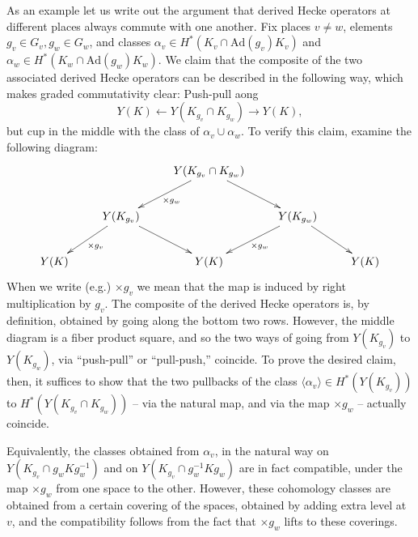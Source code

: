 \documentclass[10pt]{amsart}
\newcommand{\changecolor}{black}
\newcommand{\Ad}{\mathrm{Ad}}
\theoremstyle{remark}
\begin{document}
{\color{\changecolor}    As an example let us write out the argument that derived Hecke operators at different places always commute with one another.   
 Fix places $v \neq w$, elements $g_v \in G_v, g_w \in G_w$,
 and classes $\alpha_v \in H^*(K_v \cap \Ad(g_v) K_v)$ and $\alpha_w \in H^*(K_w \cap \Ad(g_w) K_w)$. 
We claim that the composite of the two associated derived Hecke operators
can be described in the following  way, which makes graded commutativity clear: Push-pull aong
 $$Y(K) \leftarrow Y(K_{g_v} \cap K_{g_w}) \rightarrow Y(K),$$ 
 but cup in the middle with the class of $\alpha_v \cup \alpha_w$.  To verify this claim, examine the following diagram: 
  {\small \begin{equation}
 \xymatrix{
 && Y(K_{g_v} \cap K_{g_w})  \ar[ld]^{\times g_w} \ar[rd] && \\
 & Y(K_{g_v})  \ar[ld]^{\times g_v}  \ar[rd] && Y(K_{g_w}) \ar[ld]^{\times g_w} \ar[rd] & \\ 
 Y(K) && Y(K) && Y(K)
 }
 \end{equation}}
When we write (e.g.) $\times g_v$ we mean that the map is induced by right multiplication by $g_v$. 
The composite of the derived Hecke operators is, by definition, obtained by going along the bottom two rows.
However, the  
 middle diagram is a fiber product square,
 and so the two ways of going from $Y(K_{g_v})$ to $Y(K_{g_w})$, via ``push-pull'' or ``pull-push,'' coincide. 
 To prove the desired claim, then, it suffices to show that the two pullbacks of the class
 $\langle \alpha_v \rangle \in H^*(Y(K_{g_v}))$  to
 $H^*(Y(K_{g_v} \cap K_{g_w}))$ -- via the natural map, and via the map $\times g_w$ -- actually coincide.  
 
 Equivalently, the classes obtained from $\alpha_v$, in the natural way
 on $Y(K_{g_v} \cap g_w K g_w^{-1})$ and on $Y(K_{g_v} \cap g_w^{-1} K  g_w)$
 are in fact compatible, under the map $\times g_w$ from one space to the other. 
 However, these cohomology classes are obtained from a certain covering of the spaces,
 obtained by adding extra level at $v$, and the compatibility follows from the fact that $\times g_w$
 lifts to these coverings. 
% 
%  
   }
\end{document}
